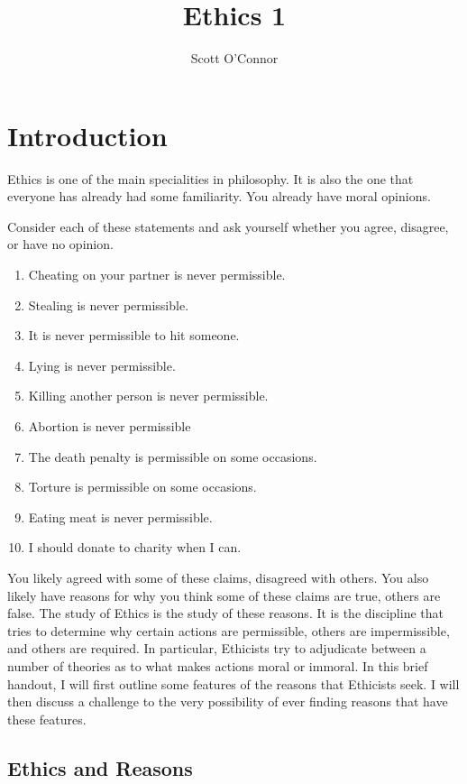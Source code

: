 \documentclass[9pt]{article}
\title{Ethics 1}
\author{Scott O’Connor}
\providecommand{\tightlist}{%
  \setlength{\itemsep}{0pt}\setlength{\parskip}{0pt}}
\begin{document}
\maketitle


\section{Introduction}\label{introduction}

Ethics is one of the main specialities in philosophy. It is also the one
that everyone has already had some familiarity. You already have moral
opinions.

Consider each of these statements and ask yourself whether you agree,
disagree, or have no opinion.

\begin{enumerate}
\def\labelenumi{\arabic{enumi}.}
\tightlist
\item
  Cheating on your partner is never permissible.
\item
  Stealing is never permissible.
\item
  It is never permissible to hit someone.
\item
  Lying is never permissible.
\item
  Killing another person is never permissible.
\item
  Abortion is never permissible
\item
  The death penalty is permissible on some occasions.
\item
  Torture is permissible on some occasions.
\item
  Eating meat is never permissible.
\item
  I should donate to charity when I can.
\end{enumerate}

You likely agreed with some of these claims, disagreed with others. You
also likely have reasons for why you think some of these claims are
true, others are false. The study of Ethics is the study of these
reasons. It is the discipline that tries to determine why certain
actions are permissible, others are impermissible, and others are
required. In particular, Ethicists try to adjudicate between a number of
theories as to what makes actions moral or immoral. In this brief
handout, I will first outline some features of the reasons that
Ethicists seek. I will then discuss a challenge to the very possibility
of ever finding reasons that have these features.

\subsection{Ethics and Reasons}\label{ethics-and-reasons}
\end{document}
